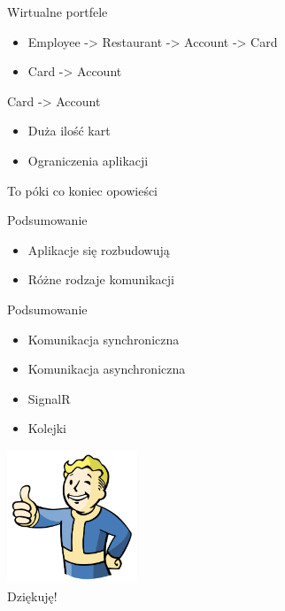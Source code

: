 \documentclass{beamer}
\begin{document}
\begin{frame}{Wirtualne portfele}
	\begin{huge}
		\begin{itemize}
			\item Employee -> Restaurant -> Account -> Card
			\item Card -> Account
		\end{itemize}
	\end{huge}
\end{frame}

\begin{frame}{Card -> Account}
	\begin{huge}
		\begin{itemize}
			\item Duża ilość kart
			\item Ograniczenia aplikacji
		\end{itemize}
	\end{huge}
\end{frame}

\begin{frame}{}
	\begin{center}
		\Huge{To póki co koniec opowieści}
	\end{center}
\end{frame}

\begin{frame}{Podsumowanie}
	\begin{huge}
		\begin{itemize}[<+->]
			\item Aplikacje się rozbudowują
			\item Różne rodzaje komunikacji
		\end{itemize}
	\end{huge}
\end{frame}

\begin{frame}{Podsumowanie}
	\begin{huge}
		\begin{itemize}[<+->]
			\item Komunikacja synchroniczna
			\item Komunikacja asynchroniczna
			\item SignalR
			\item Kolejki
		\end{itemize}
	\end{huge}
\end{frame}

\begin{frame}{}
	\begin{center}
  		\includegraphics[height=4cm]{ok.png} \\
		\Huge{Dziękuję!}
	\end{center}
\end{frame}
\end{document}
